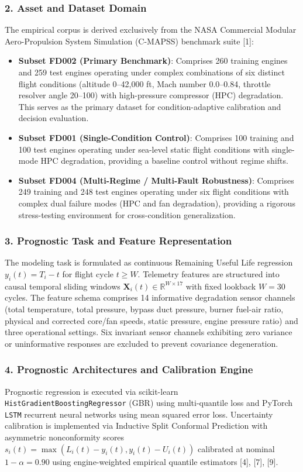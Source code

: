 \documentclass[12pt,a4paper]{article}
\begin{document}
\subsubsection*{2. Asset and Dataset Domain}
The empirical corpus is derived exclusively from the NASA Commercial Modular Aero-Propulsion System Simulation (C-MAPSS) benchmark suite [1]:
\begin{itemize}
    \item \textbf{Subset FD002 (Primary Benchmark)}: Comprises 260 training engines and 259 test engines operating under complex combinations of six distinct flight conditions (altitude 0--42,000 ft, Mach number 0.0--0.84, throttle resolver angle 20--100) with high-pressure compressor (HPC) degradation. This serves as the primary dataset for condition-adaptive calibration and decision evaluation.
    \item \textbf{Subset FD001 (Single-Condition Control)}: Comprises 100 training and 100 test engines operating under sea-level static flight conditions with single-mode HPC degradation, providing a baseline control without regime shifts.
    \item \textbf{Subset FD004 (Multi-Regime / Multi-Fault Robustness)}: Comprises 249 training and 248 test engines operating under six flight conditions with complex dual failure modes (HPC and fan degradation), providing a rigorous stress-testing environment for cross-condition generalization.
\end{itemize}

\subsubsection*{3. Prognostic Task and Feature Representation}
The modeling task is formulated as continuous Remaining Useful Life regression $y_i(t) = T_i - t$ for flight cycle $t \ge W$. Telemetry features are structured into causal temporal sliding windows $\mathbf{X}_i(t) \in \mathbb{R}^{W \times 17}$ with fixed lookback $W = 30$ cycles. The feature schema comprises 14 informative degradation sensor channels (total temperature, total pressure, bypass duct pressure, burner fuel-air ratio, physical and corrected core/fan speeds, static pressure, engine pressure ratio) and three operational settings. Six invariant sensor channels exhibiting zero variance or uninformative responses are excluded to prevent covariance degeneration.

\subsubsection*{4. Prognostic Architectures and Calibration Engine}
Prognostic regression is executed via scikit-learn \texttt{HistGradientBoostingRegressor} (GBR) using multi-quantile loss and PyTorch \texttt{LSTM} recurrent neural networks using mean squared error loss. Uncertainty calibration is implemented via Inductive Split Conformal Prediction with asymmetric nonconformity scores $s_i(t) = \max(L_i(t) - y_i(t), y_i(t) - U_i(t))$ calibrated at nominal $1 - \alpha = 0.90$ using engine-weighted empirical quantile estimators [4], [7], [9].
\end{document}
